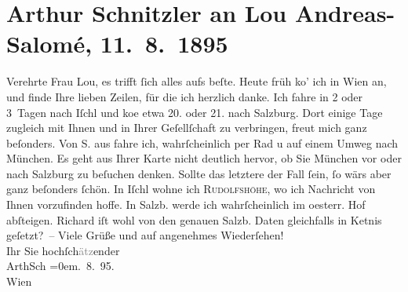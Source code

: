 

         
         \renewcommand{\erwaehntePersonen}{Personen: Lou Andreas-Salomé, Richard Beer-Hofmann}
         \renewcommand{\erwaehnteOrte}{Orte: Bad Ischl, Hotel und Pension Rudolfshöhe (Leopold Petter), München, Salzburg, Wien, Österreichischer Hof}
         \renewcommand{\erwaehnteWerke}{}
               \section[Arthur Schnitzler an Lou Andreas-Salomé, 11. 8. 1895]{ Arthur Schnitzler an Lou Andreas-Salomé, 11. 8. 1895}\nopagebreak{}\rehead{ }\begin{ledgroupsized}[t]{13cm}\normalsize\beginnumbering \toendnotes[C]{\smallbreak\pagebreak[2]} 
\pstart{}{\pb}Verehrte Frau Lou,\pend\pstart
           es trifft ſich alles aufs beſte. Heute früh ko{\geminationm}’ ich in
                  Wien an, und  finde Ihre lieben Zeilen, für die ich herzlich danke.\pend
           \pstart
           Ich fahre in 2 oder 3 Tagen nach Iſchl und ko{\geminationm}e etwa 20. oder 21. nach Salzburg. Dort einige Tage zugleich mit Ihnen und
               in Ihrer Geſellſchaft zu verbringen, freut {\pb}mich ganz beſonders. Von S. aus fahre ich, wahrſcheinlich per Rad u auf
               einem Umweg nach München. Es geht aus Ihrer
               Karte nicht deutlich hervor, ob Sie München vor
               oder nach Salzburg zu beſuchen denken. Sollte das
               letztere der Fall ſein, ſo wärs aber ganz beſonders ſchön.\pend
           \pstart
           In Iſchl wohne ich \textsc{Rudolfshöhe}, {\pb}wo ich Nachricht von Ihnen vorzufinden hoffe. In Salzb. werde ich wahrſcheinlich im oesterr. Hof abſteigen. Richard iſt wohl von den genauen Salzb.
               Daten gleichfalls in Ke{\geminationn}tnis geſetzt? – \pend
           \pstart
           Viele Grüße und auf angenehmes Wiederſehen!{\\[\baselineskip]}Ihr Sie
                  hochſch\textcolor{gray}{ätz}ender{\\[\baselineskip]}\spacefill\mbox{ArthSch}\pend
           \leftskip=0em{}. 8. 95.{\\}Wien\pend
           

\end{ledgroupsized}
